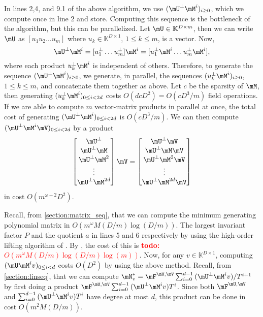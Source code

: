 \documentclass[12pt]{article}
\newcommand{\todo}[1]{\textcolor{red}{{\bf todo:} #1}}
\begin{document}
In lines 2,4, and 9.1 of the above algorithm, we use $(\mU^{\perp}\mM^i)_{i\ge 0}$, which we compute once
in line 2 and store. Computing this sequence is the bottleneck of the algorithm, but this can be
parallelized. Let $\mU \in \mathbb{K}^{D \times m}$, then we can write $\mU$ as $[u_1 u_2 \dots u_m]$ where
$u_k \in \mathbb{K}^{D \times 1}$, $1 \le k \le m$, is a vector. Now,
$$ \mU^{\perp} \mM^i = [u_1^{\perp} \dots u_m^{\perp}] \mM^i = [u_1^{\perp} \mM^i \dots u_m^{\perp} \mM^i],$$
where each product $u_k^{\perp} \mM^i$ is independent of others. Therefore, to generate the
sequence $(\mU^{\perp}\mM^i)_{i\ge0}$, we generate, in parallel, 
the sequences $(u_k^{\perp} \mM^i)_{i\ge0}$, $1 \le k \le m$, and concatenate them together as above.
Let $c$ be the sparsity of $\mM$, then generating $(u_k^{\perp} \mM^i)_{0 \le i < 2d}$ costs 
$O(d cD^2) = O(cD^3/m )$ field operations. If we are able to compute $m$ 
vector-matrix products in parallel at once, the total cost of generating $(\mU^{\perp}\mM^i)_{0 \le i < 2d}$
is $O(cD^3/m)$. We can then compute $(\mU^{\perp}\mM^i\mV)_{0 \le i < 2d}$ by a product
$$
\begin{bmatrix}
\mU^{\perp}\\
\mU^{\perp} \mM\\
\mU^{\perp} \mM^2\\
\vdots\\
\mU^{\perp} \mM^{2d}\\
\end{bmatrix} \mV
= 
\begin{bmatrix}
\mU^{\perp} \mV\\
\mU^{\perp} \mM \mV\\
\mU^{\perp} \mM^2 \mV\\
\vdots \\
\mU^{\perp} \mM^{2d} \mV\\
\end{bmatrix}
$$
in cost $O(m^{\omega-2}D^2)$.

Recall, from \cref{section:matrix_seq}, that we can compute
the minimum generating polynomial matrix in $O(m^{\omega} M(D/m) \log(D/m))$.
The largest invariant factor $P$ and the quotient $a$ in lines 5 and 6 respectively by using the high-order
lifting algorithm of \cite[Algorithm~5]{Stor03}. 
By \cite[Corollary~16]{Stor03}, the cost of this is 
\todo{$O(m^{\omega} M(D/m) \log(D/m) \log(m))$}.
Now, for any $v\in\mathbb{K}^{D \times 1}$, computing $(\mU \mM^i v)_{0\le i < d}$ costs
$O(D^2)$ by using the above method.
Recall, from \cref{section:linseq}, that
we can compute $\mN_v^* = \mF^{\mU,\mV}\sum_{i=0}^{d-1} {(\mU^{\perp}\mM^iv)}/{T^{i+1}}$ by first
doing a product $\mF^{\mU,\mV}\sum_{i=0}^{d-1} {(\mU^{\perp}\mM^iv)}T^i$.
Since both $\mF^{\mU,\mV}$ and $\sum_{i=0}^{d-1} {(\mU^{\perp}\mM^iv)}T^i$
have degree at most $d$, this product can be done in cost $O(m^2M(D/m))$.
\end{document}
